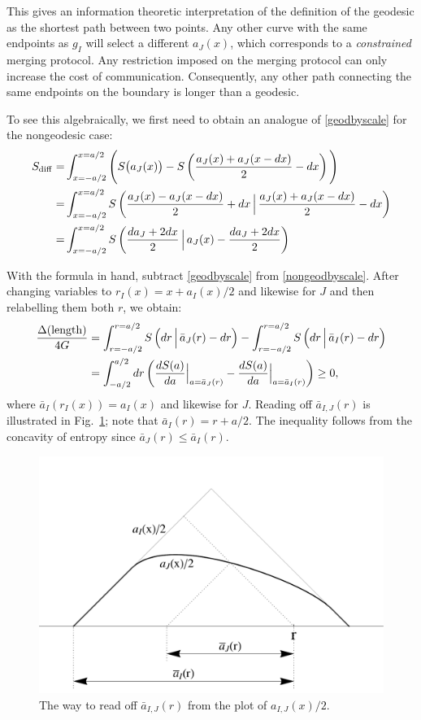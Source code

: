 \documentclass[12pt]{article}
\def\sdiff{S_{\rm diff}}
\begin{document}
This gives an information theoretic interpretation of the definition of the geodesic as the shortest path between two points. Any other curve with the same endpoints as $g_I$ will select a different $a_J(x)$, which corresponds to a \emph{constrained} merging protocol. Any restriction imposed on the merging protocol can only increase the cost of communication. Consequently, any other path connecting the same endpoints on the boundary is longer than a geodesic.

To see this algebraically, we first need to obtain an analogue of \eqref{geodbyscale} for the nongeodesic case:
\begin{align}
\sdiff = &
\int_{x = -a/2}^{x=a/2} \Bigg(S\big(a_J(x)\big) - S\left(\frac{a_J(x) + a_J(x-dx)}{2} - dx \right) \Bigg)
\nonumber \\ = &
\int_{x = -a/2}^{x=a/2} S\left(\frac{a_J(x) - a_J(x-dx)}{2} + dx \,\Big|\, \frac{a_J(x) + a_J(x-dx)}{2} - dx \right)
\nonumber \\ = &
\int_{x = -a/2}^{x=a/2} S\left(\frac{da_J+2dx}{2} \, \Big| \, a_J(x) - \frac{da_J + 2dx}{2}\right)
\label{nongeodbyscale}
\end{align}

With the formula in hand, subtract \eqref{geodbyscale} from \eqref{nongeodbyscale}. After changing variables to $r_I(x) = x+a_I(x)/2$ and likewise for $J$ and then relabelling them both $r$, we obtain:
\begin{align}
\frac{\Delta {\rm (length)}}{4G} & =
\int_{r=-a/2}^{r=a/2} S\left(dr \, \Big| \, \bar{a}_J(r) - dr\right)
-  \int_{r=-a/2}^{r=a/2} S\left(dr \, \Big| \, \bar{a}_I(r) -dr\right)
\nonumber \\ & =
\int_{-a/2}^{a/2} dr \left( \frac{dS(a)}{da} \Big|_{a = \bar{a}_J(r)} -
\frac{dS(a)}{da} \Big|_{a = \bar{a}_I(r)} \right) \geq 0
,\end{align}
where $\bar{a}_I(r_I(x)) = a_I(x)$ and likewise for $J$. Reading off $\bar{a}_{I,J}(r)$ is illustrated in Fig.~\ref{abars}; note that $\bar{a}_I(r) = r + a/2$. The inequality follows from the concavity of entropy since $\bar{a}_J(r) \leq \bar{a}_I(r)$.

\begin{figure}[t!]
\centering
\includegraphics[width=.5\textwidth]{abars.pdf}
\caption{The way to read off $\bar{a}_{I,J}(r)$ from the plot of $a_{I,J}(x)/2$.}
\label{abars}
\end{figure}
\end{document}
